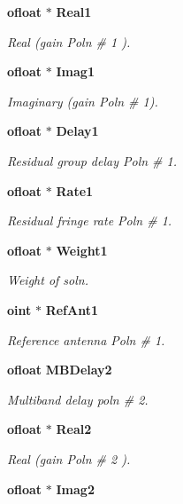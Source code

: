\begin{CompactItemize}
{\bf ofloat} $\ast$ {\bf Real1}
\begin{CompactList}\small\item\em Real (gain Poln \# 1 ). \item\end{CompactList}\item 
{\bf ofloat} $\ast$ {\bf Imag1}
\begin{CompactList}\small\item\em Imaginary (gain Poln \# 1). \item\end{CompactList}\item 
{\bf ofloat} $\ast$ {\bf Delay1}
\begin{CompactList}\small\item\em Residual group delay Poln \# 1. \item\end{CompactList}\item 
{\bf ofloat} $\ast$ {\bf Rate1}
\begin{CompactList}\small\item\em Residual fringe rate Poln \# 1. \item\end{CompactList}\item 
{\bf ofloat} $\ast$ {\bf Weight1}
\begin{CompactList}\small\item\em Weight of soln. \item\end{CompactList}\item 
{\bf oint} $\ast$ {\bf Ref\-Ant1}
\begin{CompactList}\small\item\em Reference antenna Poln \# 1. \item\end{CompactList}\item 
{\bf ofloat} {\bf MBDelay2}
\begin{CompactList}\small\item\em Multiband delay poln \# 2. \item\end{CompactList}\item 
{\bf ofloat} $\ast$ {\bf Real2}
\begin{CompactList}\small\item\em Real (gain Poln \# 2 ). \item\end{CompactList}\item 
{\bf ofloat} $\ast$ {\bf Imag2}

\end{CompactItemize}
